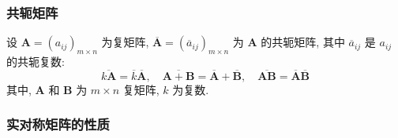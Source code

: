 \documentclass{article}
\begin{document}
			\subsubsection{共轭矩阵}
				设 $\boldsymbol{A}=\left(a_{i j}\right)_{m \times n}$ 为复矩阵, $\overline{\boldsymbol{A}}=\left(\overline{a}_{i j}\right)_{m \times n}$ 为 $\boldsymbol{A}$ 的共轭矩阵, 其中 $\overline{a}_{i j}$ 是 $a_{i j}$ 的共轭复数:
				$$
				\overline{k \boldsymbol{A}}=\overline{k}\overline{\boldsymbol{A}}, \quad \overline{\boldsymbol{A}+\boldsymbol{B}}=\overline{\boldsymbol{A}}+\overline{\boldsymbol{B}}, \quad \overline{\boldsymbol{A B}}=\overline{\boldsymbol{A}}\overline{\boldsymbol{B}}
				$$
				其中, $\boldsymbol{A}$ 和 $\boldsymbol{B}$ 为 $m \times n$ 复矩阵, $k$ 为复数.
				\subsubsection{实对称矩阵的性质}
\end{document}
